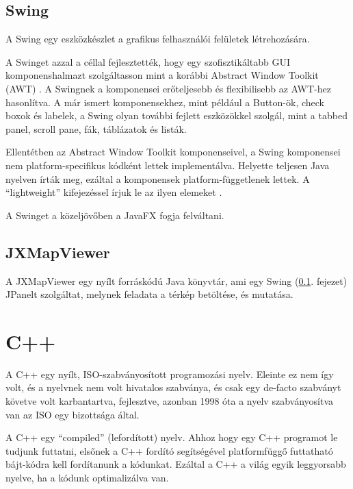 \documentclass[a4paper,12pt]{report}
\begin{document}
\subsection{Swing}
\label{swing}

A Swing egy eszközkészlet a grafikus felhasználói felületek létrehozására.

\vspace{2mm}
A Swinget azzal a céllal fejlesztették, hogy egy szofisztikáltabb GUI komponenshalmazt szolgáltasson mint a korábbi Abstract Window Toolkit (AWT) \cite{awt}. A Swingnek a komponensei erőteljesebb és flexibilisebb az AWT-hez hasonlítva. A már ismert komponensekhez, mint például a Button-ök, check boxok és labelek, a Swing olyan további fejlett eszközökkel szolgál, mint a tabbed panel, scroll pane, fák, táblázatok és listák.

\vspace{2mm}
Ellentétben az Abstract Window Toolkit komponenseivel, a Swing komponensei nem platform-specifikus kódként lettek implementálva. Helyette teljesen Java nyelven írták meg, ezáltal a komponensek platform-függetlenek lettek. A ``lightweight'' kifejezéssel írjuk le az ilyen elemeket \cite{swingarticle}.

\vspace{2mm}
A Swinget a közeljövőben a JavaFX \cite{javafx} fogja felváltani.

\subsection{JXMapViewer}
\label{jxmapviewer}

A JXMapViewer \cite{jxmapv} egy nyílt forráskódú Java könyvtár, ami egy Swing (\ref{swing}. fejezet) JPanelt \cite{jpanel} szolgáltat, melynek feladata a térkép betöltése, és mutatása.

\newpage
\section{C++}
\label{cplusplus}

A C++ egy nyílt, ISO-szabványosított programozási nyelv. Eleinte ez nem így volt, és a nyelvnek nem volt hivatalos szabványa, és csak egy de-facto szabványt követve volt karbantartva, fejlesztve, azonban 1998 óta \cite{c++98} a nyelv szabványosítva van az ISO egy bizottsága által.

\vspace{2mm}
A C++ egy ``compiled'' (lefordított) nyelv. Ahhoz hogy egy C++ programot le tudjunk futtatni, elsőnek a C++ fordító segítségével platformfüggő futtatható bájt-kódra kell fordítanunk a kódunkat. Ezáltal a C++ a világ egyik leggyorsabb nyelve, ha a kódunk optimalizálva van.
\end{document}
